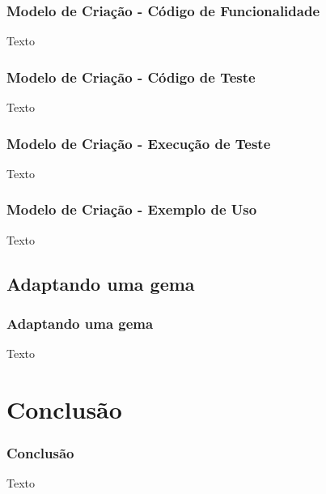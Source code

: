\documentclass[10pt]{beamer}
\begin{document}
\begin{frame}
\frametitle{Modelo de Criação - Código de Funcionalidade}
 Texto
\end{frame}

\begin{frame}
\frametitle{Modelo de Criação - Código de Teste}
 Texto
\end{frame}

\begin{frame}
\frametitle{Modelo de Criação - Execução de Teste}
 Texto
\end{frame}

\begin{frame}
\frametitle{Modelo de Criação - Exemplo de Uso}
 Texto
\end{frame}

\subsection{Adaptando uma gema}
\begin{frame}
\frametitle{Adaptando uma gema}
Texto
\end{frame}

\section{Conclusão}
\begin{frame}
 \frametitle{Conclusão}
 Texto
\end{frame}
\end{document}
